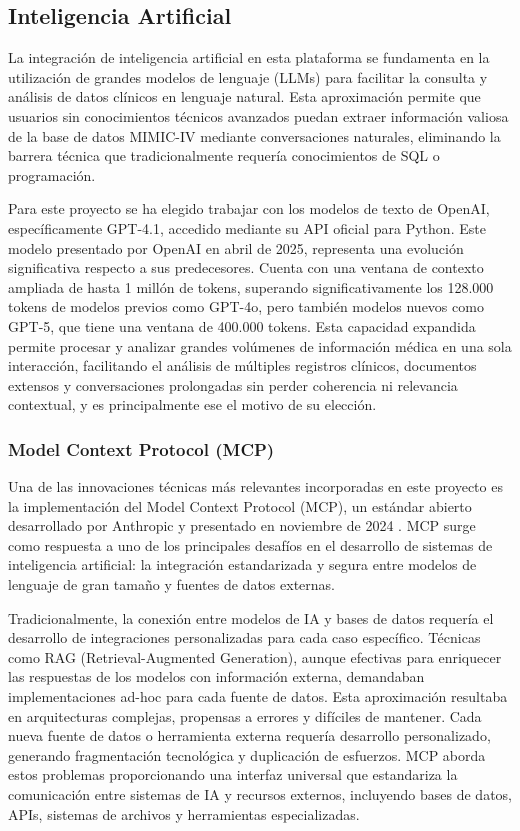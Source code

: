 \subsection{Inteligencia Artificial}

La integración de inteligencia artificial en esta plataforma se fundamenta en la utilización de grandes modelos de lenguaje (LLMs) para facilitar la consulta y análisis de datos clínicos en lenguaje natural. Esta aproximación permite que usuarios sin conocimientos técnicos avanzados puedan extraer información valiosa de la base de datos MIMIC-IV mediante conversaciones naturales, eliminando la barrera técnica que tradicionalmente requería conocimientos de SQL o programación.

Para este proyecto se ha elegido trabajar con los modelos de texto de OpenAI, específicamente GPT-4.1, accedido mediante su API oficial para Python. Este modelo presentado por OpenAI en abril de 2025, representa una evolución significativa respecto a sus predecesores. Cuenta con una ventana de contexto ampliada de hasta 1 millón de tokens, superando significativamente los 128.000 tokens de modelos previos como GPT-4o, pero también modelos nuevos como GPT-5, que tiene una ventana de 400.000 tokens. Esta capacidad expandida permite procesar y analizar grandes volúmenes de información médica en una sola interacción, facilitando el análisis de múltiples registros clínicos, documentos extensos y conversaciones prolongadas sin perder coherencia ni relevancia contextual, y es principalmente ese el motivo de su elección.

\subsubsection{Model Context Protocol (MCP)}

Una de las innovaciones técnicas más relevantes incorporadas en este proyecto es la implementación del Model Context Protocol (MCP), un estándar abierto desarrollado por Anthropic y presentado en noviembre de 2024 \cite{AnthropicMCP2024}. MCP surge como respuesta a uno de los principales desafíos en el desarrollo de sistemas de inteligencia artificial: la integración estandarizada y segura entre modelos de lenguaje de gran tamaño y fuentes de datos externas.


Tradicionalmente, la conexión entre modelos de IA y bases de datos requería el desarrollo de integraciones personalizadas para cada caso específico. Técnicas como RAG (Retrieval-Augmented Generation), aunque efectivas para enriquecer las respuestas de los modelos con información externa, demandaban implementaciones ad-hoc para cada fuente de datos. Esta aproximación resultaba en arquitecturas complejas, propensas a errores y difíciles de mantener. Cada nueva fuente de datos o herramienta externa requería desarrollo personalizado, generando fragmentación tecnológica y duplicación de esfuerzos. MCP aborda estos problemas proporcionando una interfaz universal que estandariza la comunicación entre sistemas de IA y recursos externos, incluyendo bases de datos, APIs, sistemas de archivos y herramientas especializadas.


